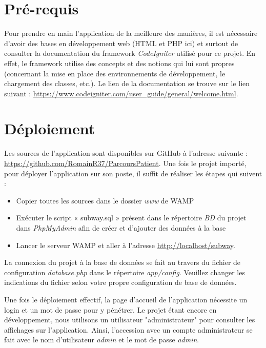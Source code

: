 \documentclass{polytech/polytech}
\begin{document}
\section{Pré-requis}

Pour prendre en main l'application de la meilleure des manières, il est nécessaire d'avoir des bases en développement web (HTML et PHP ici) et surtout de consulter la documentation du framework \textit{CodeIgniter} utilisé pour ce projet. En effet, le framework utilise des concepts et des notions qui lui sont propres (concernant la mise en place des environnements de développement, le chargement des classes, etc.). Le lien de la documentation se trouve sur le lien suivant : \url{https://www.codeigniter.com/user_guide/general/welcome.html}.


\section{Déploiement}

Les sources de l'application sont disponibles sur GitHub à l'adresse suivante :
\url{https://github.com/RomainR37/ParcoursPatient}. Une fois le projet importé, pour déployer l'application sur son poste, il suffit de réaliser les étapes qui suivent : 

\begin{itemize}
	\item Copier toutes les sources dans le dossier \textit{www} de WAMP
	\item Exécuter le script « subway.sql » présent dans le répertoire \textit{BD} du projet dans \textit{PhpMyAdmin} afin de créer et d'ajouter des données à la base 
	\item Lancer le serveur WAMP et aller à l'adresse \url{http://localhost/subway}.
\end{itemize}

La connexion du projet à la base de données se fait au travers du fichier de configuration \textit{database.php} dans le répertoire \textit{app/config}. Veuillez changer les indications du fichier selon votre propre configuration de base de données.

Une fois le déploiement effectif, la page d'accueil de l'application nécessite un login et un mot de passe pour y pénétrer. Le projet étant encore en développement, nous utilisons un utilisateur "administrateur" pour consulter les affichages sur l'application. Ainsi, l'accession avec un compte administrateur se fait avec le nom d'utilisateur \textit{admin} et le mot de passe \textit{admin}.
\end{document}
